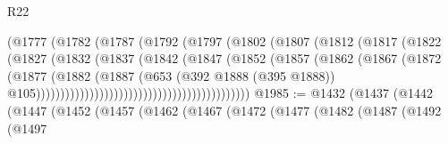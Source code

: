 \begin{lexlean}{R22}
\begin{coremodule}
                                            (@1777
                                              (@1782
                                                (@1787
                                                  (@1792
                                                    (@1797
                                                      (@1802
                                                        (@1807
                                                          (@1812
                                                            (@1817
                                                              (@1822
                                                                (@1827
                                                                  (@1832
                                                                    (@1837
                                                                      (@1842
                                                                        (@1847
                                                                          (@1852
                                                                            (@1857
                                                                              (@1862
                                                                                (@1867
                                                                                  (@1872
                                                                                    (@1877
                                                                                      (@1882
                                                                                        (@1887
                                                                                          (@653
                                                                                            (@392
                                                                                              @1888
                                                                                              (@395
                                                                                                @1888))
                                                                                            @105))))))))))))))))))))))))))))))))))))))))))))
@1985 := @1432
    (@1437
      (@1442
        (@1447
          (@1452
            (@1457
              (@1462
                (@1467
                  (@1472
                    (@1477
                      (@1482
                        (@1487
                          (@1492
                            (@1497

\end{coremodule}
\end{lexlean}
